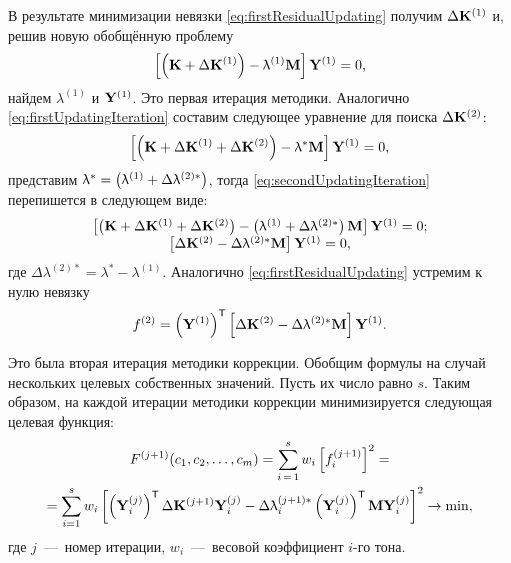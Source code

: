 В результате минимизации невязки \eqref{eq:firstResidualUpdating} получим $ \Delta \mathbf{K} ^ {(1)} $ и, решив новую обобщённую проблему
\begin{equation}
	\left[ \left( \mathbf{K} + \Delta \mathbf{K} ^ {(1)} \right) - \uplambda ^ {(1)} \mathbf{M} \right] \mathbf{Y} ^ {(1)} = 0,
\end{equation}
найдем $ \lambda ^ {(1)} $ и $ \mathbf{Y} ^ {(1)} $. Это первая итерация методики. Аналогично \eqref{eq:firstUpdatingIteration} составим следующее уравнение для поиска $ \Delta \mathbf{K} ^ {(2)} $:
\begin{equation}
	\left[ \left( \mathbf{K} + \Delta \mathbf{K} ^ {(1)} + \Delta \mathbf{K} ^ {(2)} \right) - \uplambda ^ \ast \mathbf{M} \right] \mathbf{Y} ^ {(1)} = 0,
	\label{eq:secondUpdatingIteration}
\end{equation}
представим $ \uplambda ^ \ast = \left( \uplambda ^ {(1)} + \Delta \uplambda ^ {(2) \ast} \right) $, тогда \eqref{eq:secondUpdatingIteration} перепишется в следующем виде:
\begin{equation}
	\begin{matrix}
		\left[ \left( \mathbf{K} + \Delta \mathbf{K} ^ {(1)} + \Delta \mathbf{K} ^ {(2)} \right) - \left( \uplambda ^ {(1)} + \Delta \uplambda ^ {(2) \ast} \right) \mathbf{M} \right] \mathbf{Y} ^ {(1)} = 0; \\
		\left[ \Delta \mathbf{K} ^ {(2)} - \Delta \uplambda ^ {(2) \ast} \mathbf{M} \right] \mathbf{Y} ^ {(1)} = 0,
	\end{matrix}
\end{equation}
где $ \Delta \lambda ^ {(2) \ast} = \lambda ^ \ast - \lambda ^ {(1)} $. Аналогично \eqref{eq:firstResidualUpdating} устремим к нулю невязку
\begin{equation}
	f ^ {(2)} = \left( \mathbf{Y} ^ {(1)} \right) ^ \mathsf{T} \left[ \Delta \mathbf{K} ^ {(2)} - \Delta \uplambda ^ {(2) \ast} \mathbf{M} \right] \mathbf{Y} ^ {(1)}.
\end{equation}

Это была вторая итерация методики коррекции. Обобщим формулы на случай нескольких целевых собственных значений. Пусть их число равно $ s $. Таким образом, на каждой итерации методики коррекции минимизируется следующая целевая функция:
\begin{gather}
	F ^ {(j + 1)}(c_1, c_2, \hdots, c_m) = \sum\limits_{i\,=\,1}^s w_i \left[ f_i ^ {(j + 1)} \right] ^ 2 = \nonumber \\
	= \sum\limits_{i = 1} ^ s w_i \left[ \left( \mathbf{Y}_i ^ {(j)} \right) ^ \mathsf{T} \Delta \mathbf{K} ^ {(j + 1)} \mathbf{Y}_i ^ {(j)} - \Delta \uplambda_i ^ {(j + 1) \ast} \left( \mathbf{Y}_i ^ {(j)} \right) ^ \mathsf{T} \mathbf{M} \mathbf{Y}_i ^ {(j)} \right] ^ 2 \rightarrow \min,
	\label{eq:objFunUpdating}
\end{gather}
где $ j $~---~номер итерации, $ w_i $~---~весовой коэффициент $ i $-го тона.

